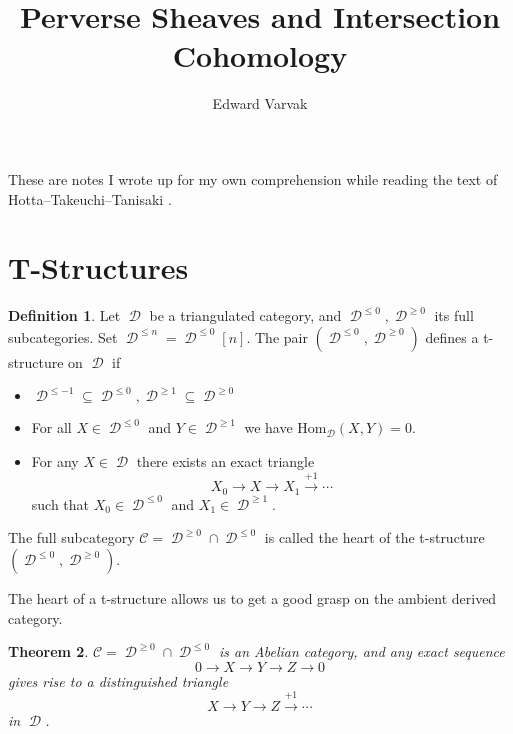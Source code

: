 \documentclass[12pt]{amsart}
\title{Perverse Sheaves and Intersection Cohomology}
\author{Edward Varvak}
\newcommand{\Hom}{\text{Hom}}
\DeclareMathOperator{\D}{\mathcal{D}}
\newtheorem{theorem}{Theorem}[section]
\theoremstyle{definition}
\newtheorem{definition}[theorem]{Definition}
\theoremstyle{remark}
\numberwithin{equation}{section}
\begin{document}
\maketitle

These are notes I wrote up for my own comprehension while reading the text of
Hotta--Takeuchi--Tanisaki \cite{HTT}.

\section{T-Structures}
\begin{definition}
    Let $\D$ be a triangulated category, and $\D^{\leq 0}, \D^{\geq 0}$ its full subcategories. Set $\D^{\leq n} = \D^{\leq 0}[n]$. The pair $(\D^{\leq 0}, \D^{\geq 0})$ defines a t-structure on $\D$ if
    \begin{itemize}
        \item $\D^{\leq -1} \subseteq \D^{\leq 0}, \D^{\geq 1} \subseteq \D^{\geq 0}$
        \item For all $X \in \D^{\leq 0}$ and $Y \in \D^{\geq 1}$ we have $\Hom_{\D}(X, Y) = 0.$
        \item For any $X \in \D$ there exists an exact triangle
        \begin{equation}
            X_0 \to X \to X_1 \overset{+1}{\to} \cdots
        \end{equation}
        such that $X_0 \in \D^{\leq 0}$ and $X_1 \in \D^{\geq 1}$.
    \end{itemize}
    The full subcategory $\mathcal{C} = \D^{\geq 0} \cap \D^{\leq 0}$ is called the heart of the t-structure $(\D^{\leq 0}, \D^{\geq 0})$.
\end{definition}

The heart of a t-structure allows us to get a good grasp on the ambient derived category.
\begin{theorem}
    $\mathcal{C} = \D^{\geq 0} \cap \D^{\leq 0}$ is an Abelian category, and any exact sequence
    \begin{equation*}
        0 \to X \to Y \to Z \to 0
    \end{equation*}
    gives rise to a distinguished triangle
    \begin{equation*}
        X \to Y \to Z \overset{+1}{\to} \cdots
    \end{equation*}
    in $\D$.
\end{theorem}
\end{document}
